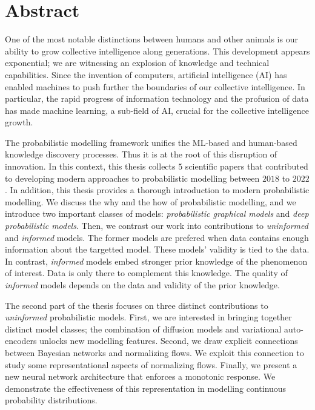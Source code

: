 
\chapter*{Abstract}
One of the most notable distinctions between humans and other animals is our ability to grow collective intelligence along generations. This development appears exponential; we are witnessing an explosion of knowledge and technical capabilities. Since the invention of computers, artificial intelligence (AI) has enabled machines to push further the boundaries of our collective intelligence.
In particular, the rapid progress of information technology and the profusion of data has made machine learning, a sub-field of AI, crucial for the collective intelligence growth.

The probabilistic modelling framework unifies the ML-based and human-based knowledge discovery processes. Thus it is at the root of this disruption of innovation. In this context, this thesis collects $5$ scientific papers that contributed to developing modern approaches to probabilistic modelling between $2018$ to $2022$.
In addition, this thesis provides a thorough introduction to modern probabilistic modelling. We discuss the why and the how of probabilistic modelling, and we introduce two important classes of models: \textit{probabilistic graphical models} and \textit{deep probabilistic models}. Then, we contrast our work into contributions to \textit{uninformed} and \textit{informed} models. The former models are prefered when data contains enough information about the targetted model. These models' validity is tied to the data. In contrast, \textit{informed} models embed stronger prior knowledge of the phenomenon of interest. Data is only there to complement this knowledge. The quality of \textit{informed} models depends on the data and validity of the prior knowledge.

The second part of the thesis focuses on three distinct contributions to \textit{uninformed} probabilistic models. First, we are interested in bringing together distinct model classes; the combination of diffusion models and variational auto-encoders unlocks new modelling features. Second, we draw explicit connections between Bayesian networks and normalizing flows. We exploit this connection to study some representational aspects of normalizing flows. Finally, we present a new neural network architecture that enforces a monotonic response. We demonstrate the effectiveness of this representation in modelling continuous probability distributions.

